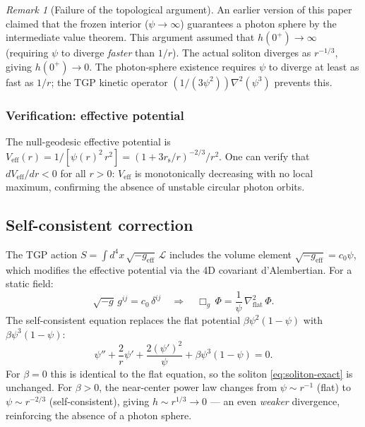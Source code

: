 \documentclass[11pt,a4paper]{article}
\theoremstyle{definition}
\theoremstyle{remark}
\newtheorem{remark}[theorem]{Remark}
\newcommand{\rs}{r_{\mathrm{s}}}
\renewcommand{\Phi}{\varPhi}
\begin{document}
\begin{remark}[Failure of the topological argument]\label{rem:topo-fail}
An earlier version of this paper claimed that the frozen interior
($\psi \to \infty$) guarantees a photon sphere by the intermediate value
theorem.  This argument assumed that $h(0^{+}) \to \infty$ (requiring
$\psi$ to diverge \emph{faster} than $1/r$).  The actual soliton
diverges as $r^{-1/3}$, giving $h(0^{+}) \to 0$.  The photon-sphere
existence requires $\psi$ to diverge at least as fast as $1/r$; the
TGP kinetic operator $(1/(3\psi^2))\nabla^2(\psi^3)$ prevents this.
\end{remark}

\subsubsection{Verification: effective potential}

The null-geodesic effective potential is
$V_{\mathrm{eff}}(r) = 1/[\psi(r)^2\,r^2]
 = (1 + 3\rs/r)^{-2/3}/r^2$.
One can verify that $dV_{\mathrm{eff}}/dr < 0$ for all $r > 0$:
$V_{\mathrm{eff}}$ is monotonically decreasing with no local maximum,
confirming the absence of unstable circular photon orbits.

\subsection{Self-consistent correction}\label{ssec:self-consistent}

The TGP action $S = \int d^4x\,\sqrt{-g_{\mathrm{eff}}}\,\mathcal{L}$
includes the volume element $\sqrt{-g_{\mathrm{eff}}} = c_0\psi$, which
modifies the effective potential via the 4D covariant d'Alembertian.
For a static field:
\begin{equation}
  \sqrt{-g}\,g^{ij} = c_0\,\delta^{ij}
  \quad\Rightarrow\quad
  \Box_g\,\Phi = \frac{1}{\psi}\,\nabla^2_{\mathrm{flat}}\,\Phi.
\end{equation}
The self-consistent equation replaces the flat potential
$\beta\psi^2(1-\psi)$ with $\beta\psi^3(1-\psi)$:
\begin{equation}\label{eq:self-consistent}
  \psi'' + \frac{2}{r}\psi' + \frac{2(\psi')^2}{\psi}
  + \beta\psi^3(1-\psi) = 0.
\end{equation}
For $\beta = 0$ this is identical to the flat equation, so the soliton
\eqref{eq:soliton-exact} is unchanged.  For $\beta > 0$, the
near-center power law changes from $\psi \sim r^{-1}$ (flat) to
$\psi \sim r^{-2/3}$ (self-consistent), giving $h \sim r^{1/3} \to 0$
--- an even \emph{weaker} divergence, reinforcing the absence of a
photon sphere.
\end{document}
